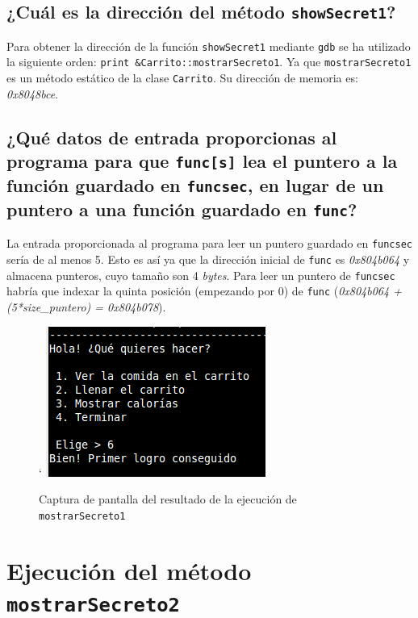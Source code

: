 \documentclass[10pt,a4paper]{article}
\begin{document}
\subsection{¿Cuál es la dirección del método \texttt{showSecret1}?}

Para obtener la dirección de la función \texttt{showSecret1} mediante \texttt{gdb} se ha utilizado la siguiente orden: \texttt{print \&{}Carrito::mostrarSecreto1}. Ya que \texttt{mostrarSecreto1} es un método estático de la clase \texttt{Carrito}. Su dirección de memoria es: \emph{0x8048bce}.


\subsection{¿Qué datos de entrada proporcionas al programa para que \texttt{func[s]} lea el puntero a la función guardado en \texttt{funcsec}, en lugar de un puntero a una función guardado en \texttt{func}?}

La entrada proporcionada al programa para leer un puntero guardado en \texttt{funcsec} sería de al menos 5. Esto es así ya que la dirección inicial de \texttt{func} es \emph{0x804b064} y almacena punteros, cuyo tamaño son 4 \emph{bytes}. Para leer un puntero de \texttt{funcsec} habría que indexar la quinta posición (empezando por 0) de \texttt{func} (\emph{0x804b064 + (5*size\_{}puntero) = 0x804b078}).\\

\begin{figure}[h!]`
\centering
\includegraphics[scale=0.8]{images/primer_logro.png}
\caption{Captura de pantalla del resultado de la ejecución de \texttt{mostrarSecreto1}}
\label{fig:mostrarSecreto1}
\end{figure}


\newpage
\section{Ejecución del método \texttt{mostrarSecreto2}}
\end{document}

